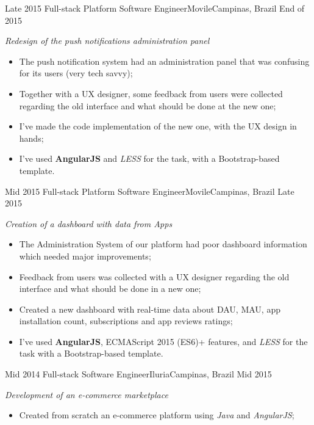 \begin{experiences}
{\begin{itemize}
          \end{itemize}
        }{}
  \experience
  {Late 2015} {Full-stack Platform Software Engineer}{Movile}{Campinas, Brazil}
  {End of 2015}
        {
        \emph{Redesign of the push notifications administration panel}\\
          \begin{itemize}
            \item The push notification system had an administration panel that was confusing for its users (very tech savvy);
            \item Together with a UX designer, some feedback from users were collected regarding the old interface and what should
            be done at the new one;
            \item I've made the code implementation of the new one, with the UX design in hands;
            \item I've used \textbf{AngularJS} and \emph{LESS} for the task, with a Bootstrap-based template.\\
          \end{itemize}
        }{}
  \experience
  {Mid 2015} {Full-stack Platform Software Engineer}{Movile}{Campinas, Brazil}
  {Late 2015}
        {
        \emph{Creation of a dashboard with data from Apps}\\
          \begin{itemize}
            \item The Administration System of our platform had poor dashboard information which needed major improvements;
            \item Feedback from users was collected with a UX designer regarding the old interface and what should be done in a new one;
            \item Created a new dashboard with real-time data about DAU, MAU, app installation count, subscriptions and app reviews ratings;
            \item I've used \textbf{AngularJS}, ECMAScript 2015 (ES6)+ features, and \emph{LESS} for the task with a Bootstrap-based template.\\
          \end{itemize}
        }{}
  \experience
  {Mid 2014} {Full-stack Software Engineer}{Iluria}{Campinas, Brazil}
  {Mid 2015}
        {
        \emph{Development of an e-commerce marketplace}\\
          \begin{itemize}
            \item Created from scratch an e-commerce platform using \emph{Java} and \emph{AngularJS};

\end{itemize}}
\end{experiences}
